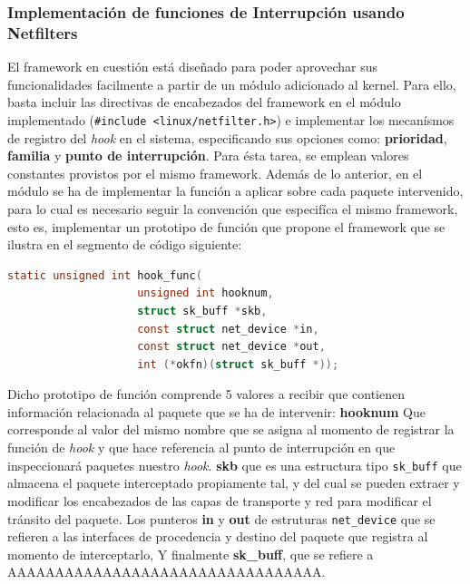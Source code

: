\subsubsection{Implementación de funciones de Interrupción usando Netfilters}

El framework en cuestión está diseñado para poder aprovechar sus funcionalidades facilmente a partir de un módulo adicionado al kernel. Para ello, basta incluir las directivas de encabezados del framework en el módulo implementado (\verb=#include <linux/netfilter.h>=) e implementar los mecanísmos de registro del \emph{hook} en el sistema, especificando sus opciones como: \textbf{prioridad}, \textbf{familia} y \textbf{punto de interrupción}. Para ésta tarea, se emplean valores constantes provistos por el mismo framework. Además de lo anterior, en el módulo se ha de implementar la función a aplicar sobre cada paquete intervenido, para lo cual es necesario seguir la convención que especifíca el mismo framework, esto es, implementar un prototipo de función que propone el framework que se ilustra en el segmento de código siguiente:

\begin{lstlisting}[language=C, frame=single, backgroundcolor=\color{mygray}, captionpos=b, caption=ESO]
static unsigned int hook_func(
            		unsigned int hooknum,
            		struct sk_buff *skb, 
            		const struct net_device *in, 
            		const struct net_device *out, 
            		int (*okfn)(struct sk_buff *));
\end{lstlisting}

Dicho prototipo de función comprende 5 valores a recibir que contienen información relacionada al paquete que se ha de intervenir: \textbf{hooknum} Que corresponde al valor del mismo nombre que se asigna al momento de registrar la función de \emph{hook} y que hace referencia al punto de interrupción en que inspeccionará paquetes nuestro \emph{hook}. \textbf{skb} que es una estructura tipo \verb=sk_buff= que almacena el paquete interceptado propiamente tal, y del cual se pueden extraer y modificar los encabezados de las capas de transporte y red para modificar el tránsito del paquete. Los punteros \textbf{in} y \textbf{out} de estruturas \verb=net_device= que se refieren a las interfaces de procedencia y destino del paquete que registra al momento de interceptarlo, Y finalmente \textbf{sk\_buff}, que se refiere a AAAAAAAAAAAAAAAAAAAAAAAAAAAAAAAAA.

